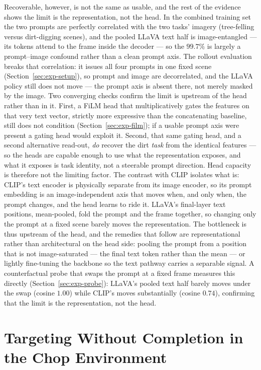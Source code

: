 Recoverable, however, is not the same as usable, and the rest of the evidence
shows the limit is the representation, not the head. In the combined training set
the two prompts are perfectly correlated with the two tasks' imagery
(tree-felling versus dirt-digging scenes), and the pooled LLaVA text half is
image-entangled --- its tokens attend to the frame inside the decoder --- so the
$99.7\%$ is largely a prompt--image confound rather than a clean prompt axis. The
rollout evaluation breaks that correlation: it issues all four prompts in one
fixed scene (Section~\ref{sec:exp-setup}), so prompt and image are decorrelated,
and the LLaVA policy still does not move --- the prompt axis is absent there, not
merely masked by the image. Two converging checks confirm the limit is upstream
of the head rather than in it. First, a FiLM head that multiplicatively gates the
features on that very text vector, strictly more expressive than the concatenating
baseline, still does not condition (Section~\ref{sec:exp-film}); if a usable
prompt axis were present a gating head would exploit it. Second, that same gating
head, and a second alternative read-out, \emph{do} recover the dirt \emph{task}
from the identical features --- so the heads are capable enough to use what the
representation exposes, and what it exposes is task identity, not a steerable
prompt direction. Head capacity is therefore not the limiting factor. The contrast
with CLIP isolates what is: CLIP's text encoder is physically separate from its
image encoder, so its prompt embedding is an image-independent axis that moves
when, and only when, the prompt changes, and the head learns to ride it. LLaVA's
final-layer text positions, mean-pooled, fold the prompt and the frame together,
so changing only the prompt at a fixed scene barely moves the representation. The
bottleneck is thus upstream of the head, and the remedies that follow are
representational rather than architectural on the head side: pooling the prompt
from a position that is not image-saturated --- the final text token rather than
the mean --- or lightly fine-tuning the backbone so the text pathway carries a
separable signal. A counterfactual probe that swaps the prompt at a fixed frame
measures this directly (Section~\ref{sec:exp-probe}): LLaVA's pooled text half
barely moves under the swap (cosine $1.00$) while CLIP's moves substantially
(cosine $0.74$), confirming that the limit is the representation, not the head.

\section{Targeting Without Completion in the Chop Environment}
\label{sec:disc-chop}

